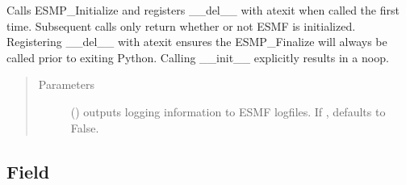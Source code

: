\documentclass[letterpaper,10pt,english]{sphinxmanual}
\begin{document}
\begin{fulllineitems}
Calls ESMP\_Initialize and registers \_\_del\_\_ with atexit when called the
first time.  Subsequent calls only return whether or not ESMF is
initialized.  Registering \_\_del\_\_ with atexit ensures the ESMP\_Finalize
will always be called prior to exiting Python.  Calling \_\_init\_\_
explicitly results in a no\sphinxhyphen{}op.
\begin{quote}\begin{description}
\item[{Parameters}] \leavevmode
{} () \textendash{} outputs logging information to ESMF logfiles. If
, defaults to False.

\end{description}\end{quote}

\end{fulllineitems}



\subsection{Field}
\label{\detokenize{field:field}}\label{\detokenize{field::doc}}
\end{document}
